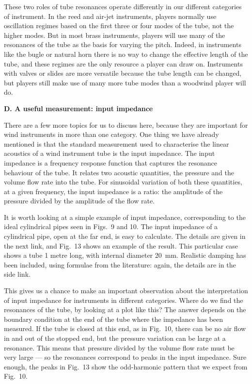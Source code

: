   These two roles of tube resonances operate differently in our different 
  categories of instrument. In the reed and air-jet instruments, players 
  normally use oscillation regimes based on the first three or four modes of 
  the tube, not the higher modes. But in most brass instruments, players will 
  use many of the resonances of the tube as the basis for varying the pitch. 
  Indeed, in instruments like the bugle or natural horn there is no way to 
  change the effective length of the tube, and these regimes are the only 
  resource a player can draw on. Instruments with valves or slides are more 
  versatile because the tube length can be changed, but players still make use 
  of many more tube modes than a woodwind player will do. 

  \textbf{D. A useful measurement: input impedance} 

  There are a few more topics for us to discuss here, because they are 
  important for wind instruments in more than one category. One thing we have 
  already mentioned is that the standard measurement used to characterise the 
  linear acoustics of a wind instrument tube is the input impedance. The input 
  impedance is a frequency response function that captures the resonance 
  behaviour of the tube. It relates two acoustic quantities, the pressure and 
  the volume flow rate into the tube. For sinusoidal variation of both these 
  quantities, at a given frequency, the input impedance is a ratio: the 
  amplitude of the pressure divided by the amplitude of the flow rate. 

  It is worth looking at a simple example of input impedance, corresponding to 
  the ideal cylindrical pipes seen in Figs.\ 9 and 10. The input impedance of a 
  cylindrical pipe, open at the far end, is easy to calculate. The details are 
  given in the next link, and Fig.\ 13 shows an example of the result. This 
  particular case shows a tube 1 metre long, with internal diameter 20~mm. 
  Realistic damping has been included, using formulae from the literature: 
  again, the details are in the side link. 


  This gives us a chance to make an important observation about the 
  interpretation of input impedance for instruments in different categories. 
  Where do we find the resonances of the tube, by looking at a plot like this? 
  The answer depends on the boundary condition at the end of the tube where the 
  impedance has been measured. If the tube is closed at this end, as in Fig.\ 
  10, there can be no air flow in and out of the stopped end, but the pressure 
  variation can be large at a resonance. This means that pressure divided by 
  the volume flow rate must be very large — so the resonances correspond to 
  peaks in the input impedance. Sure enough, the peaks in Fig.\ 13 show the 
  odd-harmonic pattern that we expect from Fig.\ 10. 

